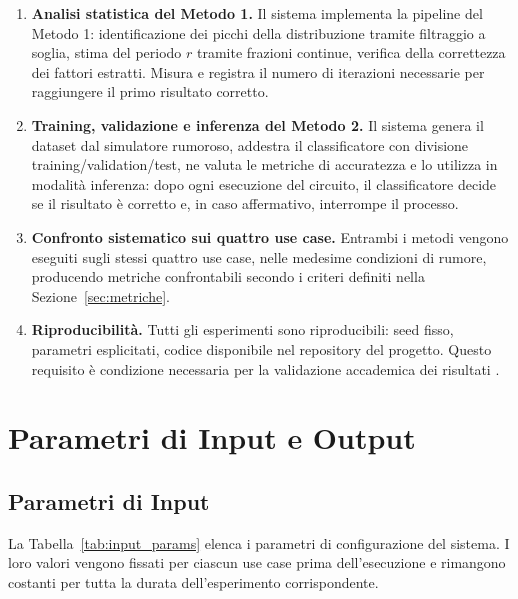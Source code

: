 \begin{onehalfspace}
\begin{enumerate}
    \item \textbf{Analisi statistica del Metodo 1.}
    Il sistema implementa la pipeline del Metodo 1: identificazione dei picchi della distribuzione tramite filtraggio a soglia, stima del periodo $r$ tramite frazioni continue, verifica della correttezza dei fattori estratti. Misura e registra il numero di iterazioni necessarie per raggiungere il primo risultato corretto.

    \item \textbf{Training, validazione e inferenza del Metodo 2.}
    Il sistema genera il dataset dal simulatore rumoroso, addestra il classificatore con divisione training/validation/test, ne valuta le metriche di accuratezza e lo utilizza in modalità inferenza: dopo ogni esecuzione del circuito, il classificatore decide se il risultato è corretto e, in caso affermativo, interrompe il processo.

    \item \textbf{Confronto sistematico sui quattro use case.}
    Entrambi i metodi vengono eseguiti sugli stessi quattro use case, nelle medesime condizioni di rumore, producendo metriche confrontabili secondo i criteri definiti nella Sezione~\ref{sec:metriche}.

    \item \textbf{Riproducibilità.}
    Tutti gli esperimenti sono riproducibili: seed fisso, parametri esplicitati, codice disponibile nel repository del progetto. Questo requisito è condizione necessaria per la validazione accademica dei risultati \cite{shor_hpec2023}.

\end{enumerate}

\section{Parametri di Input e Output}
\label{sec:input_output}

\subsection{Parametri di Input}

La Tabella~\ref{tab:input_params} elenca i parametri di configurazione del sistema. I loro valori vengono fissati per ciascun use case prima dell'esecuzione e rimangono costanti per tutta la durata dell'esperimento corrispondente.


\end{onehalfspace}
